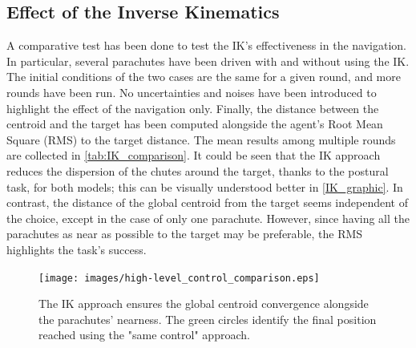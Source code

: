 \subsection{Effect of the Inverse Kinematics}
A comparative test has been done to test the IK's effectiveness in the navigation. In particular, several parachutes have been driven with and without using the IK. The initial conditions of the two cases are the same for a given round, and more rounds have been run. No uncertainties and noises have been introduced to highlight the effect of the navigation only. Finally, the distance between the centroid and the target has been computed alongside the agent's Root Mean Square (RMS) to the target distance. The mean results among multiple rounds are collected in \autoref{tab:IK_comparison}.
It could be seen that the IK approach reduces the dispersion of the chutes around the target, thanks to the postural task, for both models; this can be visually understood better in \autoref{IK_graphic}. In contrast, the distance of the global centroid from the target seems independent of the choice, except in the case of only one parachute. However, since having all the parachutes as near as possible to the target may be preferable, the RMS highlights the task's success.

\begin{figure}[h]
    \centering
    \texttt{[image: images/high-level\_control\_comparison.eps]}
    \caption{The IK approach ensures the global centroid convergence alongside the parachutes' nearness. The green circles identify the final position reached using the "same control" approach.}
    \label{fig:IK_graphic}
\end{figure}


